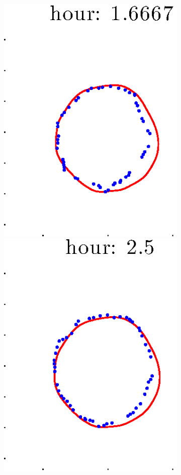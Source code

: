 \documentclass[12pt]{article}
\begin{document}
\begin{figure}[h!]
\begin{subfigure}[b]{.3\textwidth}
		\includegraphics[height=.15\textheight]{Pos14exp8/secondhalf/first3.eps}
		\includegraphics[height=.15\textheight]{Pos14exp8/secondhalf/first4.eps}

\end{subfigure}
\end{figure}
\end{document}
